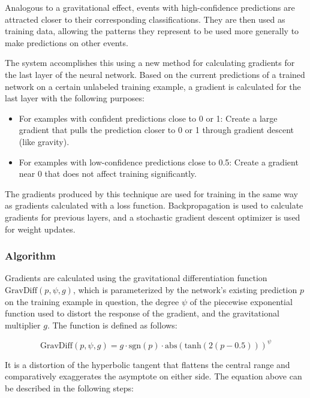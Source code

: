 \documentclass[10pt]{article}
\begin{document}
Analogous to a gravitational effect, events with high-confidence predictions are attracted closer to their corresponding classifications. They are then used as training data, allowing the patterns they represent to be used more generally to make predictions on other events.

The system accomplishes this using a new method for calculating gradients for the last layer of the neural network. Based on the current predictions of a trained network on a certain unlabeled training example, a gradient is calculated for the last layer with the following purposes:

\begin{itemize}
    \item For examples with confident predictions close to 0 or 1: Create a large gradient that pulls the prediction closer to 0 or 1 through gradient descent (like gravity).
    \item For examples with low-confidence predictions close to 0.5: Create a gradient near 0 that does not affect training significantly.
\end{itemize}

The gradients produced by this technique are used for training in the same way as gradients calculated with a loss function. Backpropagation is used to calculate gradients for previous layers, and a stochastic gradient descent optimizer \cite{sgd} is used for weight updates.

\subsubsection{Algorithm}

Gradients are calculated using the gravitational differentiation function $\mathrm{GravDiff}(p, \psi, g)$, which is parameterized by the network's existing prediction $p$ on the training example in question, the degree $\psi$ of the piecewise exponential function used to distort the response of the gradient, and the gravitational multiplier $g$. The function is defined as follows:

\begin{equation}
    \mathrm{GravDiff}(p, \psi, g) = g \cdot \mathrm{sgn}(p) \cdot \mathrm{abs}(\mathrm{tanh}(2(p - 0.5))) ^ \psi
\end{equation}

It is a distortion of the hyperbolic tangent that flattens the central range and comparatively exaggerates the asymptote on either side. The equation above can be described in the following steps:
\end{document}

